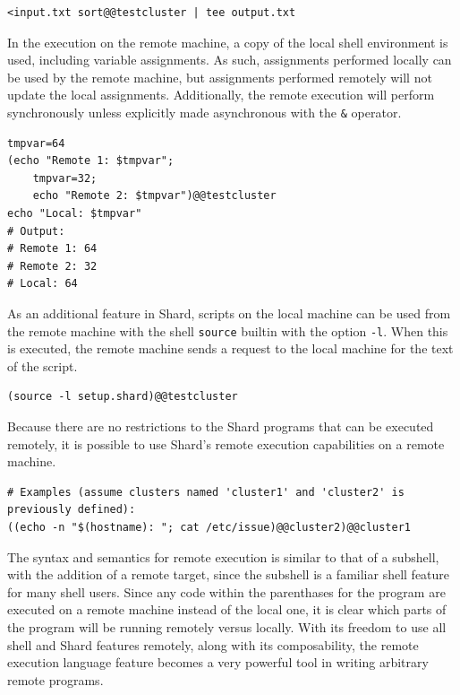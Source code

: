 \documentclass[twoside]{report}
\begin{document}
\begin{lstlisting}[language=Shard]
<input.txt sort@@testcluster | tee output.txt
\end{lstlisting}

In the execution on the remote machine, a copy of the local shell environment is used, including variable assignments.
As such, assignments performed locally can be used by the remote machine, but assignments performed remotely will not update the local assignments.
Additionally, the remote execution will perform synchronously unless explicitly made asynchronous with the \texttt{\&} operator.

\begin{lstlisting}[language=Shard]
tmpvar=64
(echo "Remote 1: $tmpvar";
    tmpvar=32;
    echo "Remote 2: $tmpvar")@@testcluster
echo "Local: $tmpvar"
# Output:
# Remote 1: 64
# Remote 2: 32
# Local: 64
\end{lstlisting}

As an additional feature in Shard, scripts on the local machine can be used from the remote machine with the shell \texttt{source} builtin with the option \texttt{-l}.
When this is executed, the remote machine sends a request to the local machine for the text of the script.

\begin{lstlisting}[language=Shard]
(source -l setup.shard)@@testcluster
\end{lstlisting}

Because there are no restrictions to the Shard programs that can be executed remotely, it is possible to use Shard's remote execution capabilities on a remote machine.

\begin{lstlisting}[language=Shard]
# Examples (assume clusters named 'cluster1' and 'cluster2' is previously defined):
((echo -n "$(hostname): "; cat /etc/issue)@@cluster2)@@cluster1
\end{lstlisting}

The syntax and semantics for remote execution is similar to that of a subshell, with the addition of a remote target, since the subshell is a familiar shell feature for many shell users.
Since any code within the parenthases for the program are executed on a remote machine instead of the local one, it is clear which parts of the program will be running remotely versus locally.
With its freedom to use all shell and Shard features remotely, along with its composability, the remote execution language feature becomes a very powerful tool in writing arbitrary remote programs.
\end{document}
